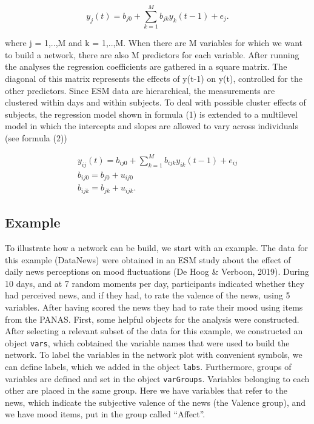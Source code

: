 \documentclass[man,floatsintext]{apa6}
\theoremstyle{definition}
\theoremstyle{definition}
\theoremstyle{definition}
\theoremstyle{remark}
\begin{document}
\begin{equation}
 y_j(t) = b_{j0} + \sum_{k=1}^{M} b_{jk} y_k(t-1) + e_j.
\end{equation}

where j = 1,..,M and k = 1,..,M. When there are M variables for which we
want to build a network, there are also M predictors for each variable.
After running the analyses the regression coefficients are gathered in a
square matrix. The diagonal of this matrix represents the effects of
y(t-1) on y(t), controlled for the other predictors. Since ESM data are
hierarchical, the measurements are clustered within days and within
subjects. To deal with possible cluster effects of subjects, the
regression model shown in formula (1) is extended to a multilevel model
in which the intercepts and slopes are allowed to vary across
individuals (see formula (2))

\begin{equation}
 \begin{split}
y_{ij}(t) = b_{ij0} + \sum_{k=1}^{M} b_{ijk} y_{ik}(t-1) + e_{ij}\\
b_{ij0} = b_{j0} + u_{ij0}\\ 
b_{ijk} = b_{jk} + u_{ijk}. 
 \end{split}
\end{equation}

\subsection{Example}\label{example}

To illustrate how a network can be build, we start with an example. The
data for this example (DataNews) were obtained in an ESM study about the
effect of daily news perceptions on mood fluctuations (De Hoog \&
Verboon, 2019). During 10 days, and at 7 random moments per day,
participants indicated whether they had perceived news, and if they had,
to rate the valence of the news, using 5 variables. After having scored
the news they had to rate their mood using items from the PANAS. First,
some helpful objects for the analysis were constructed. After selecting
a relevant subset of the data for this example, we constructed an object
\texttt{vars}, which cobtained the variable names that were used to
build the network. To label the variables in the network plot with
convenient symbols, we can define labels, which we added in the object
\texttt{labs}. Furthermore, groups of variables are defined and set in
the object \texttt{varGroups}. Variables belonging to each other are
placed in the same group. Here we have variables that refer to the news,
which indicate the subjective valence of the news (the Valence group),
and we have mood items, put in the group called \enquote{Affect}.
\end{document}

